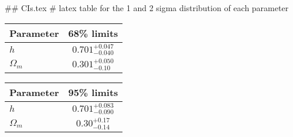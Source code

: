 ## CIs.tex
# latex table for the 1 and 2 sigma distribution of each parameter

\begin{tabular} { l  c}
 Parameter &  68\% limits\\
\hline
{\boldmath$h              $} & $0.701^{+0.047}_{-0.040}   $\\
{\boldmath$\Omega_m       $} & $0.301^{+0.050}_{-0.10}    $\\
\hline
\end{tabular}

\begin{tabular} { l  c}
 Parameter &  95\% limits\\
\hline
{\boldmath$h              $} & $0.701^{+0.083}_{-0.090}   $\\
{\boldmath$\Omega_m       $} & $0.30^{+0.17}_{-0.14}      $\\
\hline
\end{tabular}
